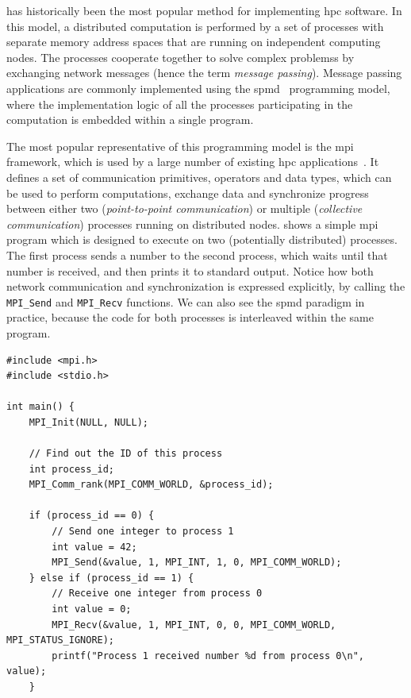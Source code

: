 \begin{description}[wide=0pt]
	\item[Message passing] has historically been the most popular method for implementing \gls{hpc} software. In
		this model, a distributed computation is performed by a set of processes with separate memory
		address spaces that are running on independent computing nodes. The processes cooperate together to
		solve complex problemss by exchanging network messages (hence the term \emph{message passing}).
		Message passing applications are commonly implemented using the
		\gls{spmd}~\cite{spmd} programming model, where the implementation logic of
		all the processes participating in the computation is embedded within a single program.

		The most popular representative of this programming model is the
		\gls{mpi}~\cite{mpi} framework, which is used by a large number of
		existing \gls{hpc} applications~\cite{mpiusagestudy2}. It defines a set of
		communication primitives, operators and data types, which can be used to perform computations,
		exchange data and synchronize progress between either two (\emph{point-to-point communication}) or multiple
		(\emph{collective communication}) processes running on distributed nodes.  shows a
		simple \gls{mpi} program which is designed to execute on two (potentially distributed)
		processes. The first process sends a number to the second process, which waits until that number is
		received, and then prints it to standard output. Notice how both network communication and
		synchronization is expressed explicitly, by calling the \texttt{MPI\_Send} and
		\texttt{MPI\_Recv} functions. We can also see the \gls{spmd} paradigm in practice,
		because the code for both processes is interleaved within the same program.

		\begin{listing}[h]
			\begin{verbatim}
#include <mpi.h>
#include <stdio.h>

int main() {
	MPI_Init(NULL, NULL);

	// Find out the ID of this process
	int process_id;
	MPI_Comm_rank(MPI_COMM_WORLD, &process_id);

	if (process_id == 0) {
		// Send one integer to process 1
		int value = 42;
		MPI_Send(&value, 1, MPI_INT, 1, 0, MPI_COMM_WORLD);
	} else if (process_id == 1) {
		// Receive one integer from process 0
		int value = 0;
		MPI_Recv(&value, 1, MPI_INT, 0, 0, MPI_COMM_WORLD, MPI_STATUS_IGNORE);
		printf("Process 1 received number %d from process 0\n", value);
	}


\end{verbatim}
\end{listing}
\end{description}
